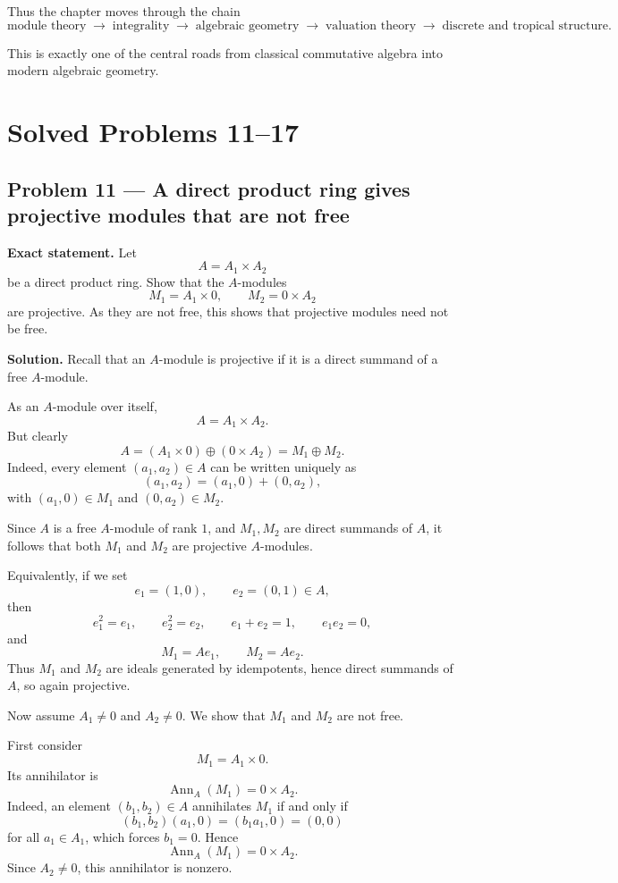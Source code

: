 \documentclass[12pt,a4paper,oneside]{report}
\theoremstyle{notespace}
\begin{document}
Thus the chapter moves through the chain
\[
\text{module theory}
\;\to\;
\text{integrality}
\;\to\;
\text{algebraic geometry}
\;\to\;
\text{valuation theory}
\;\to\;
\text{discrete and tropical structure}.
\]

This is exactly one of the central roads from classical commutative algebra into modern algebraic geometry.

\chapter{Solved Problems 11--17}

\section{Problem 11 --- A direct product ring gives projective modules that are not free}

\textbf{Exact statement.}
Let
\[
A=A_1\times A_2
\]
be a direct product ring. Show that the \(A\)-modules
\[
M_1=A_1\times 0,\qquad M_2=0\times A_2
\]
are projective. As they are not free, this shows that projective modules need not be free.

\textbf{Solution.}
Recall that an \(A\)-module is projective if it is a direct summand of a free \(A\)-module.

As an \(A\)-module over itself,
\[
A=A_1\times A_2.
\]
But clearly
\[
A=(A_1\times 0)\oplus (0\times A_2)=M_1\oplus M_2.
\]
Indeed, every element \((a_1,a_2)\in A\) can be written uniquely as
\[
(a_1,a_2)=(a_1,0)+(0,a_2),
\]
with \((a_1,0)\in M_1\) and \((0,a_2)\in M_2\).

Since \(A\) is a free \(A\)-module of rank \(1\), and \(M_1,M_2\) are direct summands of \(A\), it follows that both \(M_1\) and \(M_2\) are projective \(A\)-modules.

Equivalently, if we set
\[
e_1=(1,0),\qquad e_2=(0,1)\in A,
\]
then
\[
e_1^2=e_1,\qquad e_2^2=e_2,\qquad e_1+e_2=1,\qquad e_1e_2=0,
\]
and
\[
M_1=Ae_1,\qquad M_2=Ae_2.
\]
Thus \(M_1\) and \(M_2\) are ideals generated by idempotents, hence direct summands of \(A\), so again projective.

Now assume \(A_1\neq 0\) and \(A_2\neq 0\). We show that \(M_1\) and \(M_2\) are not free.

First consider
\[
M_1=A_1\times 0.
\]
Its annihilator is
\[
\operatorname{Ann}_A(M_1)=0\times A_2.
\]
Indeed, an element \((b_1,b_2)\in A\) annihilates \(M_1\) if and only if
\[
(b_1,b_2)(a_1,0)=(b_1a_1,0)=(0,0)
\]
for all \(a_1\in A_1\), which forces \(b_1=0\). Hence
\[
\operatorname{Ann}_A(M_1)=0\times A_2.
\]
Since \(A_2\neq 0\), this annihilator is nonzero.
\end{document}
